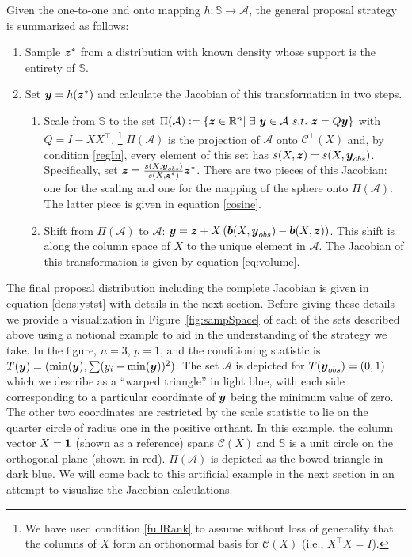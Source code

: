 \documentclass[ba]{imsart}
\newcommand{\by}{\mbox{\boldmath $y$}}
\newcommand{\bz}{\mbox{\boldmath $z$}}
\newcommand{\bb}{\mbox{\boldmath $b$}}
\newcommand{\mc}{\mathcal}
\begin{document}
Given the one-to-one and onto mapping $h: \mathbb{S} \rightarrow \mathcal{A}$, the general proposal strategy is summarized as follows:
\begin{enumerate}
\item Sample $\bz^*$ from a distribution with known density whose support is the entirety of $\mathbb{S}$.
\item Set $\by = h(\bz^*)$ and calculate the Jacobian of this transformation in two steps.
\begin{enumerate}
\item Scale from $\mathbb{S}$ to the set $\Pi(\mathcal{A}):= \{\bz\in \mathbb{R}^n |\ \exists\ \by\in \mathcal{A}\ s.t.\ \bz=Q \by \}$ with $Q = I - XX^{\top}$. \footnote{We have used condition \ref{fullRank} to assume  without loss of generality  that the columns of $X$ form an orthonormal basis for $\mc{C}(X)$ (i.e., $X^\top X=I$).} $\Pi(\mathcal{A})$ is the projection of $\mathcal{A}$ onto $\mathcal{C}^{\perp}(X)$ and, by condition \ref{regIn}, every element of this set has $s(X, \bz) = s(X, \by_{obs})$. Specifically, set $\bz=\frac{s(X,\boldsymbol{y}_{obs})}{s(X, \boldsymbol{z}^{*})}\bz^{*}$. There are two pieces of this Jacobian: one for the scaling and one for the mapping of the sphere onto $\Pi(\mathcal{A})$. The latter piece is given in equation \eqref{cosine}.
\item Shift  from $\Pi(\mathcal{A})$ to $\mathcal{A}$: $\by=\bz+X\left(\bb(X, \by_{obs})-\bb(X, \bz)\right)$. This shift is along the column space of $X$ to the unique element in $\mathcal{A}$. The Jacobian of this transformation is given by equation \eqref{eq:volume}.
\end{enumerate}
\end{enumerate}

The final proposal distribution including the complete Jacobian is given in equation \eqref{dens:ystst} with details in the next section. Before giving these details we provide a visualization  in Figure~\ref{fig:sampSpace} of each of the sets described above using a notional example to aid in the understanding of the strategy we take. In the figure, $n = 3$, $p=1$, and the conditioning statistic is $T(\by)=(\min(\by), \sum (y_i - \min(\by))^2)$. The set $\mathcal{A}$ is depicted for $T(\by_{obs})=(0,1)$ which we describe as a ``warped triangle'' in light blue, with each side corresponding to a particular coordinate of $\by$ being the minimum value of zero. The other two coordinates are restricted by the scale statistic to lie on the quarter circle of radius one in the positive orthant. In this example, the column vector $X=\bf{1}$ (shown as a reference) spans $\mc{C}(X)$  and $\mathbb{S}$ is a unit circle on the orthogonal plane (shown in red). $\Pi(\mathcal{A})$ is depicted as the bowed triangle in dark blue. We will come back to this artificial example in the next section in an attempt to visualize the Jacobian calculations.
\end{document}
